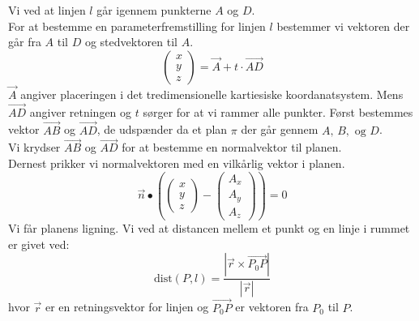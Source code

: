 \begin{tcolorbox}[title=Opgave 2,
    colback=blue!1!white,
    colframe=black,
    colbacktitle=blue!25!white,
    coltitle=red!25!black,
    fonttitle=\bfseries,
    subtitle style={boxrule=0.4pt,
    colback=blue!7!white} ]
        Vi ved at linjen \(l\) går igennem punkterne \(A\) og \(D\).\\
        For at bestemme en parameterfremstilling for linjen \(l\) bestemmer vi vektoren der går fra \(A\) til \(D\) og stedvektoren til \(A\).\\
        \[\begin{pmatrix} x\\y\\z \end{pmatrix}=\overrightarrow{A}+t\cdot \overrightarrow{AD}\]
        \(\overrightarrow{A}\) angiver placeringen i det tredimensionelle kartiesiske koordanatsystem. Mens \(\overrightarrow{AD}\) angiver retningen og \(t\) sørger for at vi rammer alle punkter.
        Først bestemmes vektor \(\overrightarrow{AB}\) og \(\overrightarrow{AD}\), de udspænder da et plan \(\pi\) der går gennem \(A,\, B,\text{ og } D\).\\
        Vi krydser \(\overrightarrow{AB}\) og \(\overrightarrow{AD}\) for at bestemme en normalvektor til planen.\\
        Dernest prikker vi normalvektoren med en vilkårlig vektor i planen.
        \[\overrightarrow{n}\bullet \left(\begin{pmatrix} x \\ y \\ z \end{pmatrix}-\begin{pmatrix}A_x \\A_y\\A_z \end{pmatrix}\right)=0\]
        Vi får planens ligning.
        Vi ved at distancen mellem et punkt og en linje i rummet er givet ved:
        \[\text{dist}(P,l)=\frac{\left| \overrightarrow{r} \times \overrightarrow{P_0 P}\right|}{\left|\overrightarrow{r} \right|}\]
        hvor \(\overrightarrow{r}\) er en retningsvektor for linjen og \(\overrightarrow{P_0 P}\) er vektoren fra \(P_0\) til \(P\).
\end{tcolorbox}